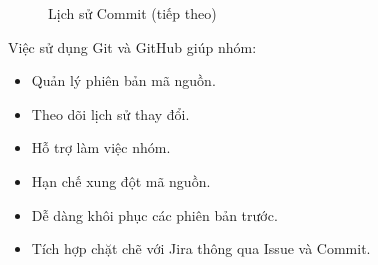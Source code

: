\begin{figure}[H]
	\centering
	\caption{Lịch sử Commit (tiếp theo)}
	\label{fig:github_commit3}
\end{figure}
Việc sử dụng Git và GitHub giúp nhóm:

\begin{itemize}
	\item Quản lý phiên bản mã nguồn.
	\item Theo dõi lịch sử thay đổi.
	\item Hỗ trợ làm việc nhóm.
	\item Hạn chế xung đột mã nguồn.
	\item Dễ dàng khôi phục các phiên bản trước.
	\item Tích hợp chặt chẽ với Jira thông qua Issue và Commit.
\end{itemize}


